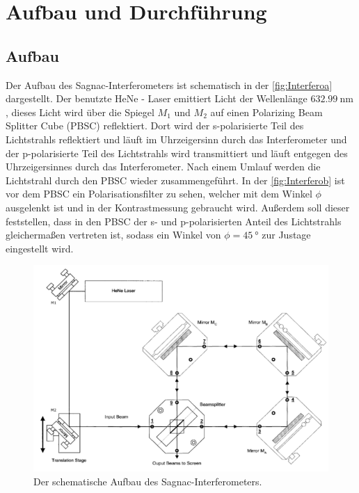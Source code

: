 \section{Aufbau und Durchführung}
\label{sec:Durchführung}

\subsection{Aufbau}

\noindent Der Aufbau des Sagnac-Interferometers ist schematisch in der \autoref{fig:Interferoa} dargestellt. Der benutzte HeNe - Laser emittiert Licht der 
Wellenlänge $\SI{632.99}{\nano\metre}$ \cite{anleitung}, dieses Licht wird über die Spiegel $M_1$ und $M_2$ auf einen Polarizing Beam Splitter Cube (PBSC) reflektiert. 
Dort wird der s-polarisierte Teil des Lichtstrahls reflektiert und läuft im Uhrzeigersinn durch das Interferometer und der p-polarisierte Teil des Lichtstrahls wird 
transmittiert und läuft entgegen des Uhrzeigersinnes durch das Interferometer. Nach einem Umlauf werden die Lichtstrahl durch den PBSC wieder zusammengeführt. In der 
\autoref{fig:Interferob} ist vor dem PBSC ein Polarisationsfilter zu sehen, welcher mit dem Winkel $\phi$ ausgelenkt ist und in der Kontrastmessung gebraucht wird. 
Außerdem soll dieser feststellen, dass in den PBSC der s- und p-polarisierten Anteil des Lichtstrahls gleichermaßen vertreten ist, sodass ein Winkel von $\phi = \SI{45}{\degree}$
zur Justage eingestellt wird.  

\begin{figure}[h]
    \centering
    \includegraphics[width=\textwidth]{bilder/Interferometer.png}
    \caption{Der schematische Aufbau des Sagnac-Interferometers. \cite{anleitung}}
    \label{fig:Interferoa}
\end{figure}

